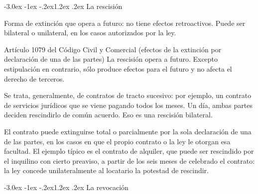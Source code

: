 \documentclass[12pt,oneside]{book}
\makeatletter
\renewcommand\section{\@startsection{section}{1}{\z@}%
  {-3.0ex \@plus -1ex \@minus -.2ex}{1.2ex \@plus .2ex}%
  {\normalfont\large\bfseries\color{acento}}}
\makeatother
\begin{document}
\section{La rescisión}

\begin{definicion}[{Rescisión}]
Forma de extinción que opera a futuro: no tiene efectos retroactivos. Puede ser bilateral o unilateral, en los casos autorizados por la ley.
\end{definicion}

\begin{articulo}{Artículo 1079 del Código Civil y Comercial (efectos de la extinción por declaración de una de las partes)}
La rescisión opera a futuro. Excepto estipulación en contrario, sólo produce efectos para el futuro y no afecta el derecho de terceros.
\end{articulo}

\begin{ejemplo}
Se trata, generalmente, de contratos de tracto sucesivo: por ejemplo, un contrato de servicios jurídicos que se viene pagando todos los meses. Un día, ambas partes deciden rescindirlo de común acuerdo. Eso es una rescisión bilateral.
\end{ejemplo}

\begin{ejemplo}
El contrato puede extinguirse total o parcialmente por la sola declaración de una de las partes, en los casos en que el propio contrato o la ley le otorgan esa facultad. El ejemplo típico es el contrato de alquiler, que puede ser rescindido por el inquilino con cierto preaviso, a partir de los seis meses de celebrado el contrato: la ley concede unilateralmente al locatario la potestad de rescindir.
\end{ejemplo}

\section{La revocación}
\end{document}
